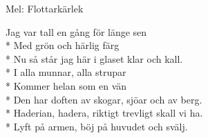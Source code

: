 \begin{SongText}
    \begin{SongInfo}
        Mel: Flottarkärlek
    \end{SongInfo}
    \begin{SongVerse}
        Jag var tall en gång för länge sen\\*%
        Med grön och härlig färg\\*%
        Nu så står jag här i glaset klar och kall.\\*%
        I alla munnar, alla strupar\\*%
        Kommer helan som en vän\\*%
        Den har doften av skogar, sjöar och av berg.\\*%
        Haderian, hadera, riktigt trevligt skall vi ha.\\*%
        Lyft på armen, böj på huvudet och svälj.
    \end{SongVerse}
\end{SongText}

